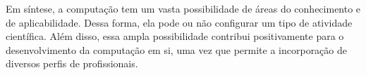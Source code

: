 Em síntese, a computação tem um vasta possibilidade de áreas do conhecimento e de aplicabilidade. Dessa forma, ela pode ou não configurar um tipo de atividade científica. Além disso, essa ampla possibilidade contribui positivamente para o desenvolvimento da computação em si, uma vez que permite a incorporação de diversos perfis de profissionais. 




